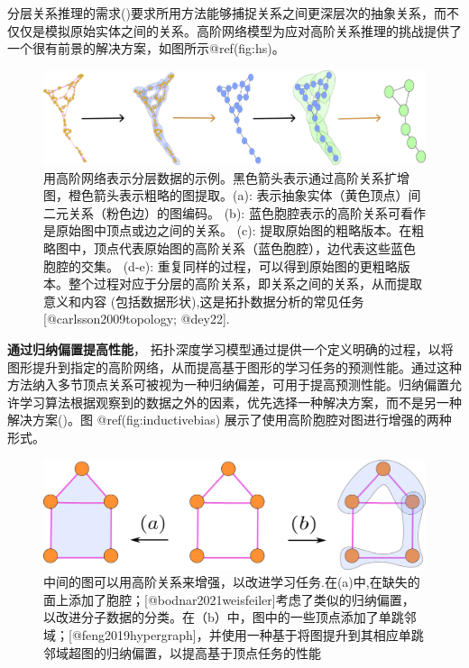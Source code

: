 \documentclass[
  12pt,
]{krantz}
\begin{document}
分层关系推理的需求()要求所用方法能够捕捉关系之间更深层次的抽象关系，而不仅仅是模拟原始实体之间的关系。高阶网络模型为应对高阶关系推理的挑战提供了一个很有前景的解决方案，如图所示@ref(fig:hs)。

\begin{figure}

{\centering \includegraphics{figures/hs} 

}

\caption{用高阶网络表示分层数据的示例。黑色箭头表示通过高阶关系扩增图，橙色箭头表示粗略的图提取。(a): 表示抽象实体（黄色顶点）间二元关系（粉色边）的图编码。 (b): 蓝色胞腔表示的高阶关系可看作是原始图中顶点或边之间的关系。 (c): 提取原始图的粗略版本。在粗略图中，顶点代表原始图的高阶关系（蓝色胞腔），边代表这些蓝色胞腔的交集。 (d-e): 重复同样的过程，可以得到原始图的更粗略版本。整个过程对应于分层的高阶关系，即关系之间的关系，从而提取意义和内容 (包括数据形状),这是拓扑数据分析的常见任务[@carlsson2009topology; @dey22].}\label{fig:hs}
\end{figure}

\textbf{通过归纳偏置提高性能}，
拓扑深度学习模型通过提供一个定义明确的过程，以将图形提升到指定的高阶网络，从而提高基于图形的学习任务的预测性能。通过这种方法纳入多节顶点关系可被视为一种归纳偏差，可用于提高预测性能。归纳偏置允许学习算法根据观察到的数据之外的因素，优先选择一种解决方案，而不是另一种解决方案()。图 @ref(fig:inductivebias)
展示了使用高阶胞腔对图进行增强的两种形式。

\begin{figure}

{\centering \includegraphics{figures/inductive_bias} 

}

\caption{中间的图可以用高阶关系来增强，以改进学习任务.在(a)中,在缺失的面上添加了胞腔；[@bodnar2021weisfeiler]考虑了类似的归纳偏置，以改进分子数据的分类。在（b）中，图中的一些顶点添加了单跳邻域；[@feng2019hypergraph]，并使用一种基于将图提升到其相应单跳邻域超图的归纳偏置，以提高基于顶点任务的性能}\label{fig:inductivebias}
\end{figure}
\end{document}
